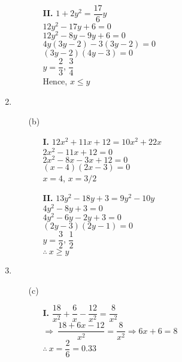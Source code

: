 \begin{multicols}{2}
\begin{enumerate}
\begin{itemize}
\begin{itemize}
    \item[{\bf II.}] $1 + 2y^2 = \dfrac{17}{6}y$\\
      $12y^2 - 17y + 6 = 0$\\
      $12y^2 - 8y - 9y + 6 = 0$\\
      $4y (3y - 2) -3 (3y - 2) = 0$\\
      $(3y - 2)(4y - 3) = 0$\\[0.2cm]
      $y = \dfrac{2}{3}$, $\dfrac{3}{4}$\\[0.2cm]
      Hence, $x \leq y$
      \end{itemize}
  \end{itemize}
\item
  \begin{itemize}
  \item[(b)]
    \begin{itemize}
    \item[{\bf I.}] $12x^2 + 11x + 12 = 10x^2 + 22x$\\
      $2x^2 - 11x + 12 = 0$\\
      $2x^2 - 8x - 3x + 12 = 0$\\
      $(x - 4)(2x - 3) = 0$\\
      $x = 4$, $x = 3/2$

    \item[{\bf II.}] $13y^2 - 18y + 3 = 9y^2 - 10y$\\
      $4y^2 - 8y + 3 = 0$\\
      $4y^2 - 6y - 2y + 3 = 0$\\
      $(2y - 3)(2y - 1) = 0$\\[0.2cm]
      $y = \dfrac{3}{2}$, $\dfrac{1}{2}$\\[0.2cm]
      $\therefore~ x \geq y$
      \end{itemize}
  \end{itemize}
\item
  \begin{itemize}
  \item[(c)]
\begin{itemize}
\item[{\bf I.}]$\dfrac{18}{x^2} + \dfrac{6}{x} - \dfrac{12}{x^2} = \dfrac{8}{x^2}$\\[0.2cm]
    $\Rightarrow~ \dfrac{18 + 6x - 12}{x^2} = \dfrac{8}{x^2} \Rightarrow 6x + 6 = 8$\\[0.2cm]
  $\therefore~ x = \dfrac{2}{6} = 0.33$


\end{itemize}
\end{itemize}
\end{enumerate}
\end{multicols}
